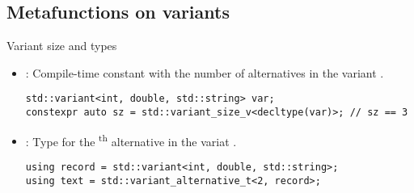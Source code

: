 \subsection{Metafunctions on variants}

\begin{frame}[t,fragile]{Variant size and types}
\begin{itemize}
  \item {}:
        Compile-time constant with the number of alternatives
        in the variant .
\begin{lstlisting}
std::variant<int, double, std::string> var;
constexpr auto sz = std::variant_size_v<decltype(var)>; // sz == 3
\end{lstlisting}

  \item {}:
        Type for the \textsuperscript{th} alternative 
        in the variat .
\begin{lstlisting}
using record = std::variant<int, double, std::string>;
using text = std::variant_alternative_t<2, record>;
\end{lstlisting}
        
\end{itemize}
\end{frame}
